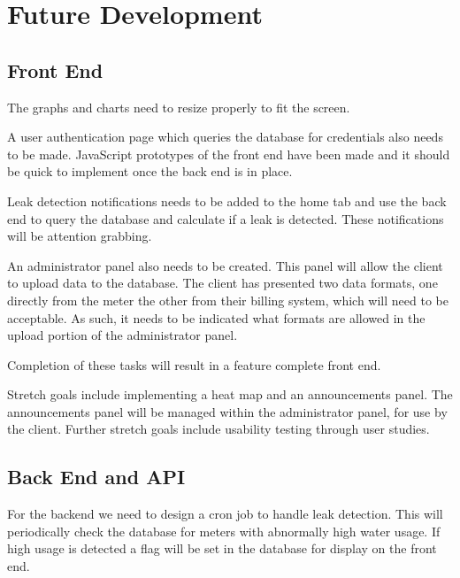 \documentclass[journal]{IEEEtran}
\begin{document}
%


\section{Future Development}
\subsection{Front End}
The graphs and charts need to resize properly to fit the screen.

A user authentication page which queries the database for credentials also needs to be made. JavaScript prototypes of the front end have been made and it should be quick to implement once the back end is in place.

Leak detection notifications needs to be added to the home tab and use the back end to query the database and calculate if a leak is detected. These notifications will be attention grabbing.

An administrator panel also needs to be created. This panel will allow the client to upload data to the database. The client has presented two data formats, one directly from the meter the other from their billing system, which will need to be acceptable. As such, it needs to be indicated what formats are allowed in the upload portion of the administrator panel.

Completion of these tasks will result in a feature complete front end.

Stretch goals include implementing a heat map and an announcements panel. The announcements panel will be managed within the administrator panel, for use by the client. Further stretch goals include usability testing through user studies.


\subsection{Back End and API} \label{future:back}
For the backend we need to design a cron job to handle leak detection. This will periodically check the database for meters with abnormally high water usage. If high usage is detected a flag will be set in the database for display on the front end. 
\end{document}
